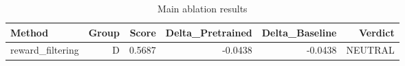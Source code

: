 \begin{table}[htbp]
\centering
\caption{Main ablation results}
\label{tab:main-results}
\begin{tabular}{lrrrrr}
\toprule
\textbf{Method} & \textbf{Group} & \textbf{Score} & \textbf{Delta\_Pretrained} & \textbf{Delta\_Baseline} & \textbf{Verdict} \\
\midrule
reward\_filtering & D & 0.5687 & -0.0438 & -0.0438 & NEUTRAL \\
\bottomrule
\end{tabular}
\end{table}